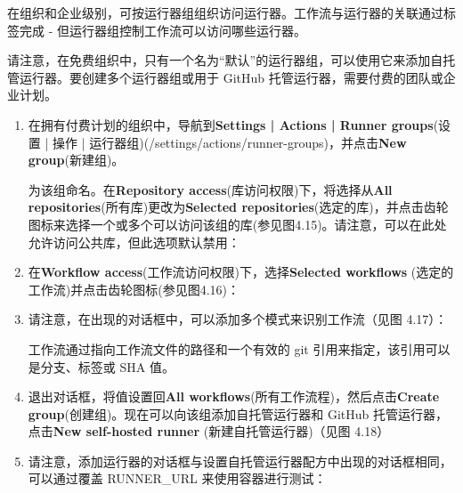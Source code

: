 在组织和企业级别，可按运行器组组织访问运行器。工作流与运行器的关联通过标签完成 - 但运行器组控制工作流可以访问哪些运行器。


请注意，在免费组织中，只有一个名为“默认”的运行器组，可以使用它来添加自托管运行器。要创建多个运行器组或用于 GitHub 托管运行器，需要付费的团队或企业计划。


\begin{enumerate}
\item 
在拥有付费计划的组织中，导航到\textbf{Settings | Actions | Runner groups}(设置 | 操作 | 运行器组)(/settings/actions/runner-groups)，并点击\textbf{New group}(新建组)。

为该组命名。在\textbf{Repository access}(库访问权限)下，将选择从\textbf{All repositories}(所有库)更改为\textbf{Selected repositories}(选定的库)，并点击齿轮图标来选择一个或多个可以访问该组的库(参见图4.15)。请注意，可以在此处允许访问公共库，但此选项默认禁用：


\item 
在\textbf{Workflow access}(工作流访问权限)下，选择\textbf{Selected workflows }(选定的工作流)并点击齿轮图标(参见图4.16)：


\item 
请注意，在出现的对话框中，可以添加多个模式来识别工作流（见图 4.17）：


工作流通过指向工作流文件的路径和一个有效的 git 引用来指定，该引用可以是分支、标签或 SHA 值。

\item 
退出对话框，将值设置回\textbf{All workflows}(所有工作流程)，然后点击\textbf{Create group}(创建组)。现在可以向该组添加自托管运行器和 GitHub 托管运行器，点击\textbf{New self-hosted runner }(新建自托管运行器)（见图 4.18）


\item 
请注意，添加运行器的对话框与设置自托管运行器配方中出现的对话框相同，可以通过覆盖 RUNNER\_URL 来使用容器进行测试：


\end{enumerate}
